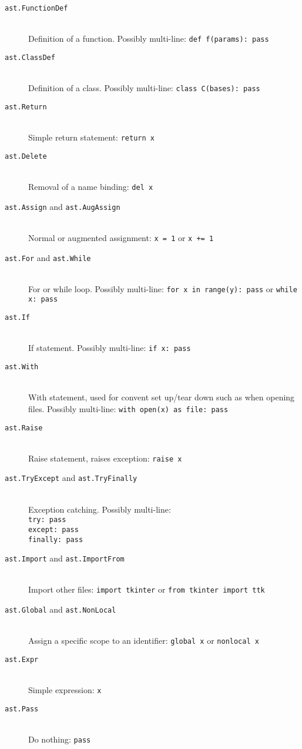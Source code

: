 \documentclass[twoside,a4paper]{report}
\begin{document}
\begin{description}
\item[\texttt{ast.FunctionDef}] \hfill \\
Definition of a function. Possibly multi-line: \texttt{def f(params): pass}
\item[\texttt{ast.ClassDef}] \hfill \\
Definition of a class. Possibly multi-line: \texttt{class C(bases): pass}
\item[\texttt{ast.Return}] \hfill \\
Simple return statement: \texttt{return x}
\item[\texttt{ast.Delete}] \hfill \\
Removal of a name binding: \texttt{del x}
\item[\texttt{ast.Assign} and \texttt{ast.AugAssign}] \hfill \\
Normal or augmented assignment: \texttt{x = 1} or \texttt{x += 1}
\item[\texttt{ast.For} and \texttt{ast.While}] \hfill \\
For or while loop. Possibly multi-line: \texttt{for x in range(y): pass} or \texttt{while x: pass}
\item[\texttt{ast.If}] \hfill \\
If statement. Possibly multi-line: \texttt{if x: pass}
\item[\texttt{ast.With}] \hfill \\
With statement, used for convent set up/tear down such as when opening files. Possibly multi-line: \texttt{with open(x) as file: pass}
\item[\texttt{ast.Raise}] \hfill \\
Raise statement, raises exception: \texttt{raise x}
\item[\texttt{ast.TryExcept} and \texttt{ast.TryFinally}] \hfill \\
Exception catching. Possibly multi-line: \\
\texttt{try: pass} \\
\texttt{except: pass} \\
\texttt{finally: pass}
\item[\texttt{ast.Import} and \texttt{ast.ImportFrom}] \hfill \\
Import other files: \texttt{import tkinter} or \texttt{from tkinter import ttk}
\item[\texttt{ast.Global} and \texttt{ast.NonLocal}] \hfill \\
Assign a specific scope to an identifier: \texttt{global x} or \texttt{nonlocal x}
\item[\texttt{ast.Expr}] \hfill \\
Simple expression: \texttt{x}
\item[\texttt{ast.Pass}] \hfill \\
Do nothing: \texttt{pass}
\end{description}
\end{document}

